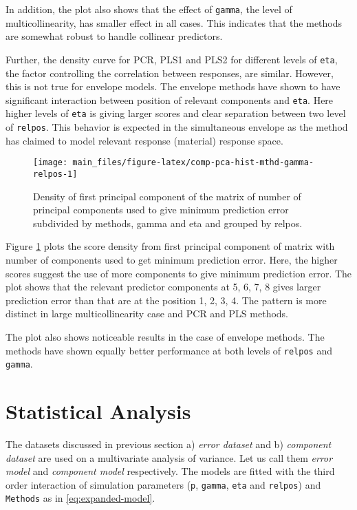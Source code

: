 \documentclass[12pt,3p,authoryear]{elsarticle}
\begin{document}
In addition, the plot also shows that the effect of \texttt{gamma}, the
level of multicollinearity, has smaller effect in all cases. This
indicates that the methods are somewhat robust to handle collinear
predictors.

Further, the density curve for PCR, PLS1 and PLS2 for different levels
of \texttt{eta}, the factor controlling the correlation between
responses, are similar. However, this is not true for envelope models.
The envelope methods have shown to have significant interaction between
position of relevant components and \texttt{eta}. Here higher levels of
\texttt{eta} is giving larger scores and clear separation between two
level of \texttt{relpos}. This behavior is expected in the simultaneous
envelope as the method has claimed to model relevant response (material)
response space.





\begin{figure}[!htb]
\texttt{[image: main\_files/figure-latex/comp-pca-hist-mthd-gamma-relpos-1]} \caption{Density of first principal component of the matrix of
number of principal components used to give minimum prediction error
subdivided by methods, gamma and eta and grouped by relpos.}\label{fig:comp-pca-hist-mthd-gamma-relpos}
\end{figure}

Figure \ref{fig:comp-pca-hist-mthd-gamma-relpos} plots the score density
from first principal component of matrix with number of components used
to get minimum prediction error. Here, the higher scores suggest the use
of more components to give minimum prediction error. The plot shows that
the relevant predictor components at 5, 6, 7, 8 gives larger prediction
error than that are at the position 1, 2, 3, 4. The pattern is more
distinct in large multicollinearity case and PCR and PLS methods.

The plot also shows noticeable results in the case of envelope methods.
The methods have shown equally better performance at both levels of
\texttt{relpos} and \texttt{gamma}.

\hypertarget{statistical-analysis}{\section{Statistical
Analysis}\label{statistical-analysis}}

The datasets discussed in previous section a) \emph{error dataset} and
b) \emph{component dataset} are used on a multivariate analysis of
variance. Let us call them \emph{error model} and \emph{component model}
respectively. The models are fitted with the third order interaction of
simulation parameters (\texttt{p}, \texttt{gamma}, \texttt{eta} and
\texttt{relpos}) and \texttt{Methods} as in \eqref{eq:expanded-model}.
\end{document}
